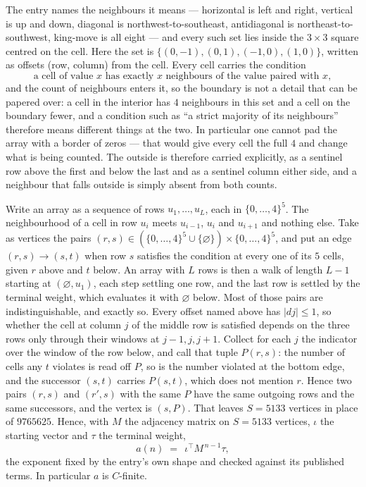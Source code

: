 \documentclass[11pt,a4paper]{article}
\theoremstyle{plain}
\theoremstyle{definition}
\begin{document}
The entry names the neighbours it means --- horizontal is left and right, vertical is up and
down, diagonal is northwest-to-southeast, antidiagonal is northeast-to-southwest, king-move is
all eight --- and every such set lies inside the $3\times3$ square centred on the cell. Here
the set is $\{(0,-1), (0,1), (-1,0), (1,0)\}$, written as offsets (row, column) from the cell. Every cell carries
the condition
\[
\text{a cell of value }x\text{ has exactly }x\text{ neighbours of the value paired with }x,
\]
and the count of neighbours enters it, so the boundary is not a detail that can be papered
over: a cell in the interior has $4$ neighbours in this set and a cell on the boundary
fewer, and a condition such as ``a strict majority of its neighbours'' therefore means
different things at the two. In particular one cannot pad the array with a border of zeros ---
that would give every cell the full $4$ and change what is being counted. The outside is
therefore carried
explicitly, as a sentinel row above the first and below the last and as a sentinel column
either side, and a neighbour that falls outside is simply absent from both counts.

Write an array as a sequence of rows $u_1,\dots,u_L$, each in
$\{0,\dots,4\}^{5}$. The neighbourhood of a cell in row $u_i$ meets $u_{i-1}$,
$u_i$ and $u_{i+1}$ and nothing else. Take as vertices the pairs
$(r,s)\in(\{0,\dots,4\}^{5}\cup\{\varnothing\})\times\{0,\dots,4\}^{5}$,
and put an edge $(r,s)\to(s,t)$ when row $s$ satisfies the condition at every one of its
$5$ cells, given $r$ above and $t$ below. An array with $L$ rows is then a walk of length
$L-1$ starting at $(\varnothing,u_1)$, each step settling one row, and the last row is
settled by the terminal weight, which evaluates it with $\varnothing$ below. Most of those pairs are indistinguishable, and exactly so. Every offset named above has $|dj|\le 1$, so whether the cell at column $j$ of the middle row is satisfied depends on the three rows only through their windows at $j-1,j,j+1$. Collect for each $j$ the indicator over the window of the row below, and call that tuple $P(r,s)$: the number of cells any $t$ violates is read off $P$, so is the number violated at the bottom edge, and the successor $(s,t)$ carries $P(s,t)$, which does not mention $r$. Hence two pairs $(r,s)$ and $(r',s)$ with the same $P$ have the same outgoing rows and the same successors, and the vertex is $(s,P)$. That leaves $S=5133$ vertices in place of $9765625$. Hence,
with $M$ the adjacency matrix on $S=5133$ vertices, $\iota$ the starting vector and $\tau$ the
terminal weight,
\[
a(n)\;=\;\,\iota^{\!\top}M^{\,n-1}\tau ,
\]
the exponent fixed by the entry's own shape and checked against its published terms. In
particular $a$ is $C$-finite.
\end{document}
